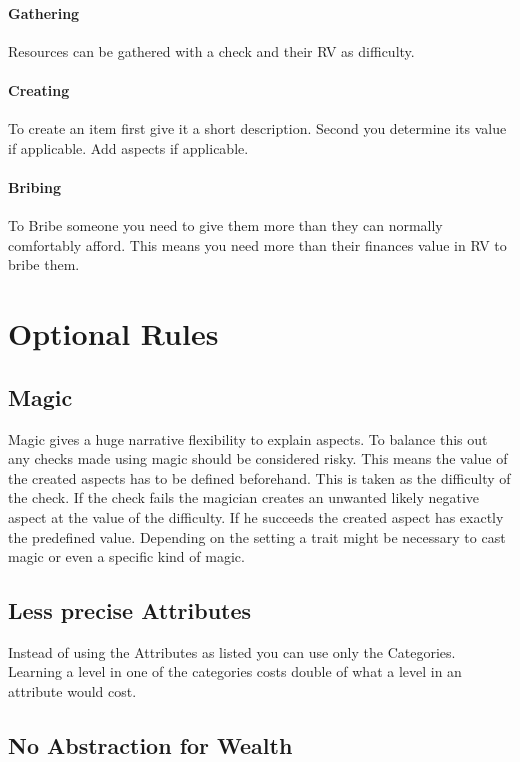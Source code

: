 \documentclass[11pt]{article}
\begin{document}
{\paragraph*{Gathering}
\label{sec:orge0e513a}
Resources can be gathered with a check and their RV as difficulty.

\paragraph*{Creating}
\label{sec:org4bcdae0}
To create an item first give it a short description. Second you determine its value if applicable. Add aspects if applicable. 

\paragraph*{Bribing}
\label{sec:org09a9945}
To Bribe someone you need to give them more than they can normally comfortably afford. This means you need more than their finances value in RV to bribe them.

\section{Optional Rules}
\label{sec:org345f5a9}
\subsection{Magic}
\label{sec:org4baea31}

Magic gives a huge narrative flexibility to explain aspects. To balance this out any checks made using magic should be considered risky. This means the value of the created aspects has to be defined beforehand. This is taken as the difficulty of the check. If the check fails the magician creates an unwanted likely negative aspect at the value of the difficulty. If he succeeds the created aspect has exactly the predefined value. Depending on the setting a trait might be necessary to cast magic or even a specific kind of magic.

\subsection{Less precise Attributes}
\label{sec:org9404024}

Instead of using the Attributes as listed you can use only the Categories. Learning a level in one of the categories costs double of what a level in an attribute would cost.

\subsection{No Abstraction for Wealth}
\label{sec:org5669a7d}

}
\end{document}
